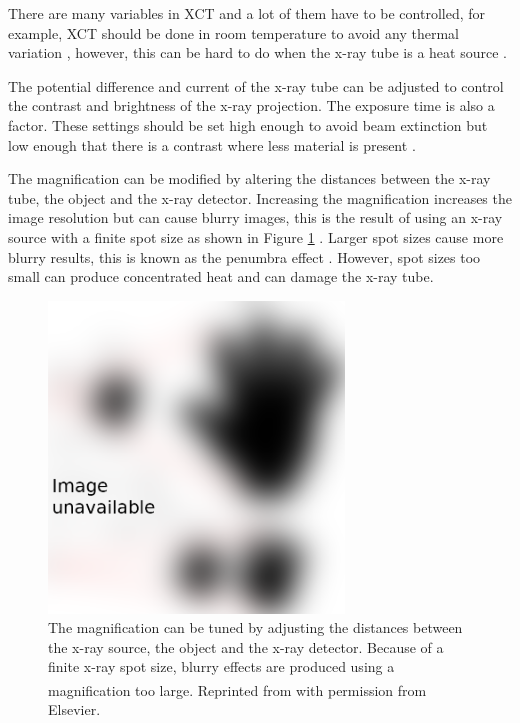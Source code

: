 There are many variables in XCT and a lot of them have to be controlled, for example, XCT should be done in room temperature to avoid any thermal variation \citep{bryan1990international}, however, this can be hard to do when the x-ray tube is a heat source \citep{kruth2011computed}.

The potential difference and current of the x-ray tube can be adjusted to control the contrast and brightness of the x-ray projection. The exposure time is also a factor. These settings should be set high enough to avoid beam extinction but low enough that there is a contrast where less material is present \citep{kruth2011computed}.

The magnification can be modified by altering the distances between the x-ray tube, the object and the x-ray detector. Increasing the magnification increases the image resolution but can cause blurry images, this is the result of using an x-ray source with a finite spot size as shown in Figure \ref{fig:literature_magnification} \citep{kruth2011computed}. Larger spot sizes cause more blurry results, this is known as the penumbra effect \citep{kueh2016modelling}. However, spot sizes too small can produce concentrated heat \citep{welkenhuyzen2009industrial} and can damage the x-ray tube.

\begin{figure}
  \centering
  \includegraphics[width=0.7\textwidth]{../figures/literatureReview/literature_magnification.png}
  \caption{The magnification can be tuned by adjusting the distances between the x-ray source, the object and the x-ray detector. Because of a finite x-ray spot size, blurry effects are produced using a magnification too large. Reprinted from \cite{kruth2011computed}\textsuperscript{\textcopyright} with permission from Elsevier.}
  \label{fig:literature_magnification}
\end{figure}

